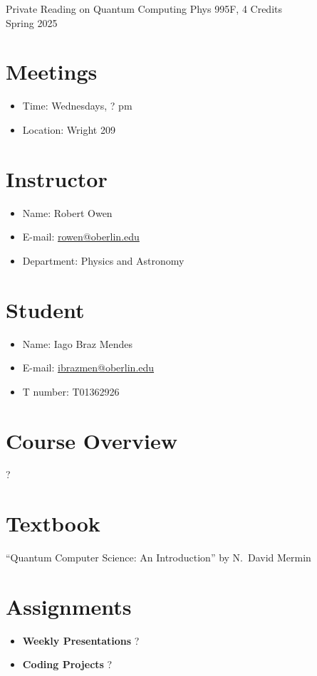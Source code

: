 \documentclass{../doc}
\begin{document}
  \header
    {Private Reading on Quantum Computing}
    {Phys 995F, 4 Credits \\ Spring 2025}

  \section*{Meetings}
    \begin{itemize}
      \item Time: Wednesdays, ? pm
      \item Location: Wright 209
    \end{itemize}

  \begin{multicols}{2}
    \section*{Instructor}
      \begin{itemize}
        \item Name: Robert Owen
        \item E-mail: \href{mailto:rowen@oberlin.edu}{rowen@oberlin.edu}
        \item Department: Physics and Astronomy
      \end{itemize}
    \columnbreak
    \section*{Student}
      \begin{itemize}
        \item Name: Iago Braz Mendes
        \item E-mail: \href{mailto:ibrazmen@oberlin.edu}{ibrazmen@oberlin.edu}
        \item T number: T01362926
    \end{itemize}
  \end{multicols}

  \section*{Course Overview}
    ?

  \section*{Textbook}
    ``Quantum Computer Science: An Introduction'' by N.~David Mermin

  \section*{Assignments}
    \begin{itemize}
      \item {\bf Weekly Presentations}
        ?
      \item {\bf Coding Projects}
        ?
    \end{itemize}
\end{document}
